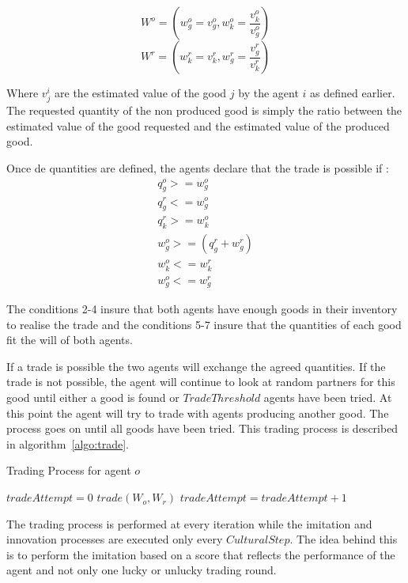 \documentclass{wscpaperproc}
\begin{document}
 $$ W^o=(w_g^o = v_g^o,w_k^o= \frac{v_k^o}{v_g^o}) $$ 
 $$ W^r=(w_k^r = v_k^r,w_g^r= \frac{v_g^r}{v_k^r}) $$

 Where $v_j^i$ are the estimated value of the good $j$ by the agent $i$ as defined earlier. 
The requested quantity of the non produced good is simply the ratio between the estimated value of the good requested and the estimated value of the produced good.


Once de quantities are defined, the agents declare that the trade is possible if :
\begin{align}
q_g^o >= w_g^o \\
q_g^r <= w_g^o \\
q_k^r >= w_k^o \\
w_g^o>=(q_g^r+w_g^r) \\
w_k^o<=w_k^r \\
w_g^o<=w_g^r
\end{align}


The conditions 2-4 insure that both agents have enough goods in their inventory to realise the trade and the conditions 5-7 insure that the quantities of each good fit the will of both agents.



If a trade is possible the two agents will exchange the agreed quantities. If the trade is not possible, the agent will continue to look at random partners for this good until either a good is found or $TradeThreshold$ agents have been tried. At this point the agent will try to trade with agents producing another good. The process goes on until all goods have been tried. This trading process is described in algorithm~\ref{algo:trade}.

\begin{algorithm}
\caption{Trading Process for agent $o$}
\label{algo:trade}
	\begin{algorithmic}[1]
	\scriptsize
			\State $tradeAttempt = 0$
					\State $trade(W_o,W_r)$
				\Else
					\State $tradeAttempt = tradeAttempt + 1$					
				\EndIf
			\EndFor
		\EndFor
\end{algorithmic}
\end{algorithm}

The trading process is performed at every iteration while the imitation and innovation processes are executed only every $CulturalStep$. The idea behind this is to perform the imitation based on a score that reflects the performance of the agent and not only one lucky or unlucky trading round.
\end{document}
